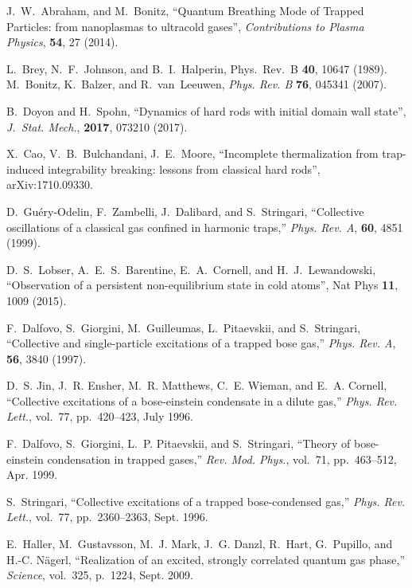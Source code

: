 \documentclass[onecolumn,pra]{revtex4-1}
\begin{document}
\begin{thebibliography}{1}
 J.~W.~Abraham, and M.~Bonitz, ``Quantum Breathing Mode of Trapped Particles:
  from nanoplasmas to ultracold gases'', {\em Contributions to Plasma Physics}, \textbf{54}, 27
  (2014).


 L.~Brey, N.~F.~Johnson, and B.~I.~Halperin, Phys.\ Rev.\ B 
  \textbf{40}, 10647 (1989).  M.~Bonitz, K.~Balzer, and R.~van~Leeuwen, 
  {\em Phys. Rev. B} \textbf{76}, 045341 (2007).



 B.~Doyon and H.~Spohn, ``Dynamics of hard rods with initial domain wall
  state'', {\em J.~Stat. Mech.}, {\bf 2017}, 073210 (2017).

 X.~Cao, V.~B.~Bulchandani, J.~E.~Moore, ``Incomplete thermalization from
  trap-induced integrability breaking: lessons from classical hard rods'', arXiv:1710.09330.


  
D.~Gu\'ery-Odelin, F.~Zambelli, J.~Dalibard, and S.~Stringari, ``Collective
  oscillations of a classical gas confined in harmonic traps,'' {\em Phys. Rev.
  A}, {\bf 60}, 4851 (1999).

 D.~S.~Lobser, A.~E.~S.~Barentine, E.~A.~Cornell, and
  H.~J.~Lewandowski, ``Observation of a persistent non-equilibrium state in cold atoms'', Nat Phys
  {\bf 11}, 1009 (2015).


F.~Dalfovo, S.~Giorgini, M.~Guilleumas, L.~Pitaevskii, and S.~Stringari,
  ``Collective and single-particle excitations of a trapped bose gas,'' {\em
  Phys. Rev. A}, {\bf 56}, 3840 (1997).

D.~S. Jin, J.~R. Ensher, M.~R. Matthews, C.~E. Wieman, and E.~A. Cornell,
  ``Collective excitations of a bose-einstein condensate in a dilute gas,''
  {\em Phys. Rev. Lett.}, vol.~77, pp.~420--423, July 1996.

F.~Dalfovo, S.~Giorgini, L.~P. Pitaevskii, and S.~Stringari, ``Theory of
  bose-einstein condensation in trapped gases,'' {\em Rev. Mod. Phys.},
  vol.~71, pp.~463--512, Apr. 1999.

S.~Stringari, ``Collective excitations of a trapped bose-condensed gas,'' {\em
  Phys. Rev. Lett.}, vol.~77, pp.~2360--2363, Sept. 1996.

E.~Haller, M.~Gustavsson, M.~J. Mark, J.~G. Danzl, R.~Hart, G.~Pupillo, and
  H.-C. Nägerl, ``Realization of an excited, strongly correlated quantum gas
  phase,'' {\em Science}, vol.~325, p.~1224, Sept. 2009.
  

\end{thebibliography}
\end{document}
